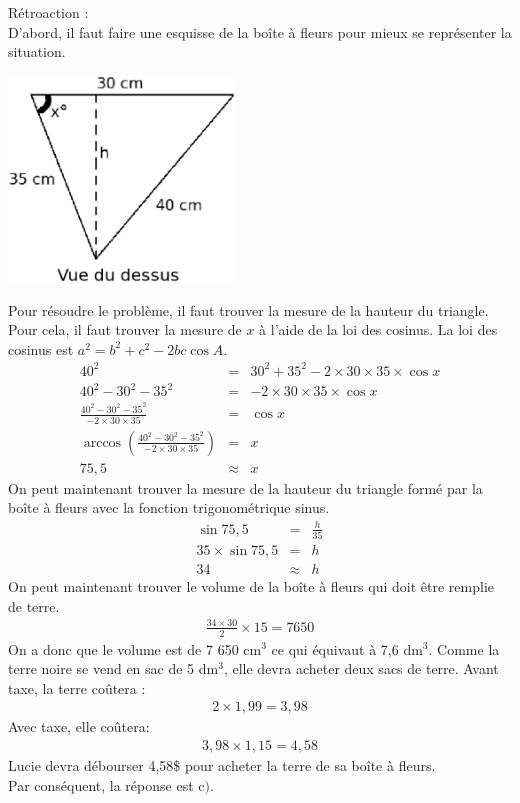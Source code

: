 \documentclass[letterpaper, 12pt]{article}
\begin{document}
R\'etroaction :\\
D'abord, il faut faire une esquisse de la bo\^ite \`a fleurs pour mieux se repr\'esenter la situation.
\begin{center}
 \includegraphics[width=6cm,bb=14 14 634 582]{Q2421.eps}
\end{center}
Pour r\'esoudre le probl\`eme, il faut trouver la mesure de la hauteur du triangle. Pour cela, il faut trouver la mesure de $x$ \`a l'aide de la loi des cosinus. La loi des cosinus est $a^{2}=b^{2}+c^{2}-2bc\cos{A}$.
\begin{eqnarray*}
 40^{2} &=& 30^{2}+35^{2}-2\times30\times35\times \cos{x}\\
 40^{2}- 30^{2}-35^{2} &=& -2\times30\times35\times \cos{x}\\[2mm]
\frac{ 40^{2}- 30^{2}-35^{2}}{-2\times30\times35} &=& \cos{x}\\[2mm]
\arccos{\left( \frac{ 40^{2}- 30^{2}-35^{2}}{-2\times30\times35}\right) } &=& x\\[2mm]
75,5&\approx& x
\end{eqnarray*}
On peut maintenant trouver la mesure de la hauteur du triangle form\'e par la bo\^ite \`a fleurs avec la fonction trigonom\'etrique sinus.
\begin{eqnarray*}
 \sin{75,5}&=& \frac{h}{35}\\[2mm]
35 \times \sin{75,5} &=& h \\[2mm]
 34 &\approx& h
\end{eqnarray*}
On peut maintenant trouver le volume de la bo\^ite \`a fleurs qui doit \^etre remplie de terre.
\begin{eqnarray*}
 \frac{34\times 30}{2}\times 15 = 7650
\end{eqnarray*}
On a donc que le volume est de 7 650 cm$^{3}$ ce qui \'equivaut \`a 7,6 dm$^{3}$. Comme la terre noire se vend en sac de 5 dm$^{3}$, elle devra acheter deux sacs de terre. Avant taxe, la terre co\^utera :
\begin{eqnarray*}
  2 \times 1,99 = 3,98
\end{eqnarray*}
Avec taxe, elle co\^utera:
\begin{eqnarray*}
  3,98 \times 1,15 = 4,58
\end{eqnarray*}
Lucie devra d\'ebourser 4,58\$ pour acheter la terre de sa bo\^ite \`a fleurs.\\
Par cons\'equent, la r\'eponse est c$)$.\\
\end{document}
